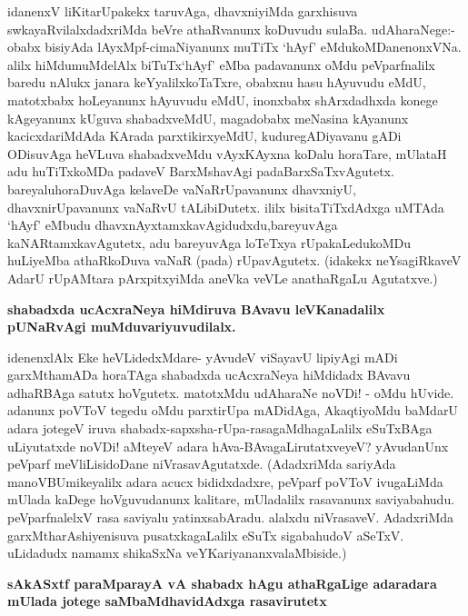 \noindent
idanenxV liKitarUpakekx taruvAga, dhavxniyiMda garxhisuva swkayaRvilalxdadxriMda beVre athaRvanunx ko\-Duvudu sulaBa. udAharaNege:- obabx bisiyAda lAyxMpf-cimaNi\-yanunx muTiTx `hAyf' eMdu\-koMDa\-nenonxVNa. alilx hiMdumuMdelAlx biTuTx\break `hAyf' eMba padavanunx oMdu peVparfnalilx baredu nAlukx janara keYyalilx\break koTaTxre, obabxnu hasu hAyu\-vudu eMdU, matotxbabx hoLeyanunx hAyu\-vudu eMdU, inonxbabx shArxdadhxda konege kAgeyanunx kUguva shabadxveMdU, maga\-dobabx meNasina kAyanunx kacicxdariMdAda KArada parxtikirxyeMdU, kuduregADi\-yavanu gADi ODisuvAga heVLuva shabadxveMdu vAyxKAyxna koDalu horaTare, mUlataH adu huTiTxkoMDa padaveV BarxMshavAgi padaBarxSaTxvAgutetx. bare\-yalu\break horaDu\-vAga kelaveDe vaNaRrUpavanunx dhavxniyU, dhavxnirUpavanunx vaNaRvU tALi\-biDutetx. ililx bisi\-taTiTxdAdxga uMTAda `hAyf' eMbudu dhavxnAyxtamxkavAgidudxdu,\break bareyuvAga kaNARtamxkavAgutetx, adu bareyuvAga loTeTxya rUpakaLedukoMDu  huLiyeMba athaRkoDuva vaNaR (pada) rUpavAgutetx. (idakekx neYsagiRkaveV AdarU rUpAMtara pArxpitxyiMda aneVka veVLe anathaRgaLu Agutatxve.) 

{\bigskip
\noindent
{\large\bf shabadxda ucAcxraNeya hiMdiruva BAvavu leVKanadalilx pUNaRvAgi muMduvariyuvudilalx.}}\label{page181}
\medskip

\noindent
idenenxlAlx Eke heVLidedxMdare- yAvudeV viSayavU lipiyAgi mADi garxMthamADa horaTAga shabadxda ucAcxraNeya hiMdidadx BAvavu adhaRBAga satutx hoVgutetx. matotxMdu udAharaNe noVDi! - oMdu hUvide. adanunx poVToV tegedu oMdu parxtirUpa mADidAga, AkaqtiyoMdu baMdarU adara jotegeV iruva shabadx-sapxsha-rUpa-rasagaMdhagaLalilx eSuTxBAga uLiyutatxde noVDi! aMteyeV adara hAva-BAvagaLirutatxveyeV? yAvudanUnx peVparf meVliLisidoDane niVrasavAgutatxde. (AdadxriMda sari\-yAda manoVBUmikeyalilx adara acucx bididxdadxre, peVparf poVToV ivugaLiMda mUlada kaDege hoVguvudanunx kalitare, mUladalilx rasavanunx saviyabahudu. peVparfnalelxV rasa saviyalu yatinxsa\-bAradu. alalxdu niVrasaveV. AdadxriMda garxMtharAshiyenisuva pusatxkagaLalilx eSuTx sigabahudoV aSeTxV. uLi\-dadudx namamx shikaSxNa veYKariyananxvalaMbiside.)

{\bigskip
\noindent
{\large\bf sAkASxtf paraMparayA vA shabadx hAgu athaRgaLige adaradara mUlada jotege saMbaMdhavidAdxga rasavirutetx}}\label{page181}
\medskip

